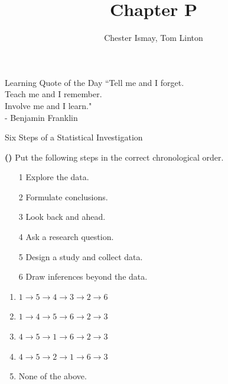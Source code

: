 \documentclass[13pt]{beamer}
\title[Chapter P]{Chapter P}
\author{Chester Ismay, Tom Linton}
\institute{Ripon College, Central College}
\date{}
\newcounter{count}
\newcommand{\quotes}[2]{\centering \Large{``#1"\\
\vspace*{0.2in}
\hspace*{0.5in} - #2}}
\newcommand{\question}{ \textbf{(\decimal{count})} \stepcounter{count}}
\begin{document}
\begin{frame}
  \titlepage
\end{frame}


\begin{frame}{Learning Quote of the Day}
\quotes{Tell me and I forget.\\ Teach me and I remember.\\ Involve me and I learn.}{Benjamin Franklin}
\end{frame}

\begin{frame}{Six Steps of a Statistical Investigation}

\question Put the following steps in the correct chronological order.

\begin{multicols}{2}
\begin{enumerate}
	\item[1] Explore the data.
    \item[2] Formulate conclusions.
    \item[3] Look back and ahead.
    \item[4] Ask a research question.
    \item[5] Design a study and collect data.
    \item[6] Draw inferences beyond the data.
\end{enumerate}
\end{multicols}

\begin{enumerate}[A]
	\item $1 \rightarrow 5 \rightarrow 4 \rightarrow 3 \rightarrow  2 \rightarrow 6$
    \item $1 \rightarrow 4 \rightarrow 5 \rightarrow 6 \rightarrow 2 \rightarrow 3$ 
    \item $4 \rightarrow 5 \rightarrow 1 \rightarrow 6 \rightarrow 2 \rightarrow 3$
    \item $4  \rightarrow 5 \rightarrow 2 \rightarrow 1  \rightarrow 6 \rightarrow 3$
    \item None of the above.
\end{enumerate}

\end{frame}
\end{document}

